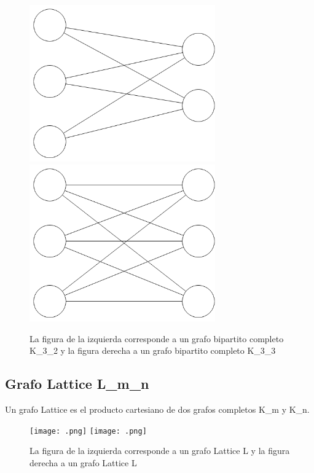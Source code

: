 \begin{figure}[H]
\includegraphics[width=80mm]{K3_2.png}
\includegraphics[width=80mm]{K3_3.png}
\caption{La figura de la izquierda corresponde a un grafo bipartito completo K_3_2 y la figura derecha a un grafo bipartito completo K_3_3}
\label{overflow}
\end{figure}


\subsection{Grafo Lattice L_m_n}
Un grafo Lattice es el producto cartesiano de dos grafos completos K_m y K_n.

\begin{figure}[H]
\texttt{[image: .png]}
\texttt{[image: .png]}
\caption{La figura de la izquierda corresponde a un grafo Lattice L y la figura derecha a un grafo Lattice L}
\label{overflow}
\end{figure}